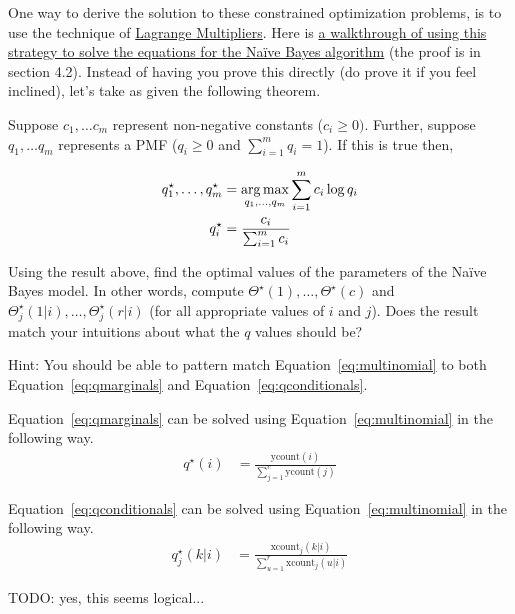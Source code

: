 \documentclass[assignment03_Solutions]{subfiles}
\begin{document}
\begin{exercise}[(60 minutes)]
One way to derive the solution to these constrained optimization problems, is to use the technique of \href{http://tutorial.math.lamar.edu/Classes/CalcIII/LagrangeMultipliers.aspx}{Lagrange Multipliers}.  Here is \href{http://www.cs.columbia.edu/~mcollins/em.pdf}{a walkthrough of using this strategy to solve the equations for the Na\"ive Bayes algorithm} (the proof is in section 4.2).  Instead of having you prove this directly (do prove it if you feel inclined), let's take as given the following theorem.

Suppose $c_1, \ldots c_m$ represent non-negative constants ($c_i \geq 0)$.  Further, suppose $q_1, \ldots q_m$ represents a PMF ($q_i \geq 0$ and $\sum_{i=1}^m q_i = 1$).  If this is true then,

\begin{align}
q^\star_1, \ldots, q^\star_m &= \operatorname*{arg\,max}_{q_1, \ldots, q_m} \sum_{i=1}^m c_i \log q_i \nonumber \\
q^\star_i &= \frac{c_i}{\sum_{i=1}^m c_i} \label{eq:multinomial}
\end{align}

Using the result above, find the optimal values of the parameters of the Na\"ive Bayes model.  In other words, compute $\Theta^\star(1), \ldots, \Theta^\star(c)$ and $\Theta_j^\star(1|i), \ldots, \Theta^\star_j(r|i)$ (for all appropriate values of $i$ and $j$).  Does the result match your intuitions about what the $q$ values should be?

Hint: You should be able to pattern match Equation~\ref{eq:multinomial} to both Equation~\ref{eq:qmarginals} and Equation~\ref{eq:qconditionals}. 

\begin{boxedsolution}
Equation~\ref{eq:qmarginals} can be solved using Equation~\ref{eq:multinomial} in the following way.
\begin{align}
q^\star(i) &= \frac{\mbox{ycount}(i)}{\sum_{j=1}^c \mbox{ycount}(j)}
\end{align}

Equation~\ref{eq:qconditionals} can be solved using Equation~\ref{eq:multinomial} in the following way.
\begin{align}
q_j^\star(k|i) &= \frac{\mbox{xcount}_j(k|i)}{\sum_{u=1}^r \mbox{xcount}_j(u|i)}
\end{align}

TODO: yes, this seems logical...
\end{boxedsolution}


\ees


\end{exercise}
\end{document}
